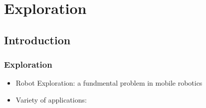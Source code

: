 \section{Exploration}
\subsection*{Introduction}


\begin{frame}
\frametitle{Exploration}
	
	\begin{itemize}
	 \item Robot Exploration: a fundmental problem in mobile robotics
  	 \item Variety of applications:
  	  	\begin{itemize}
    	\end{itemize}
    	

\end{itemize}
\end{frame}
